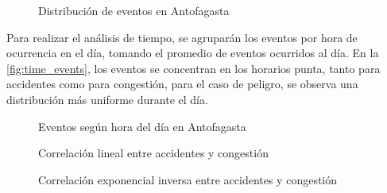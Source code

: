 \documentclass[12pt]{article}
\begin{document}
\begin{figure}[H]
    \centering
    \caption{Distribución de eventos en Antofagasta}
    \label{fig:dist_events}
\end{figure}

Para realizar el análisis de tiempo, se agruparán los eventos por hora de ocurrencia en el día, tomando el promedio de eventos ocurridos al día. En la \autoref{fig:time_events}, los eventos se concentran en los horarios punta, tanto para accidentes como para congestión, para el caso de peligro, se observa una distribución más uniforme durante el día.

\begin{figure}[H]
    \centering
    \newline
    \newline
    \newline
    \caption{Eventos según hora del día en Antofagasta}
    \label{fig:time_events}
\end{figure}



\begin{figure}[H]
    \centering
    \newline
    \newline
    \caption{Correlación lineal entre accidentes y congestión}
    \label{fig:corr_lineal}
\end{figure}


\begin{figure}[H]
    \centering
    \newline
    \newline
    \caption{Correlación exponencial inversa entre accidentes y congestión}
    \label{fig:corr_exp}
\end{figure}
\end{document}
